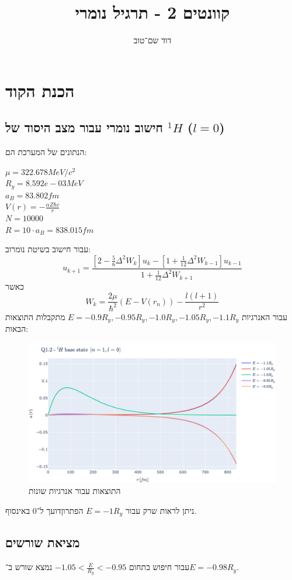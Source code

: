 \documentclass{article}
\title{קוונטים 2 - תרגיל נומרי}
\author{דוד שם־טוב}
\begin{document}
\maketitle

\section{הכנת הקוד}
\subsection{חישוב נומרי עבור מצב היסוד של ${}^{1}\!H$ ($l=0$)}
הנתונים של המערכת הם:
\begin{multicols}{3}
    $\mu = 322.678 MeV / c^2$ \\
    $R_y = 8.592e-03 MeV$ \\
    $a_B = 83.802 fm$ \\
    $V(r) = -\frac{\alpha Z \hbar c}{r}$ \\
    $N = 10000$ \\
    $R = 10\cdot a_B = 838.015 fm$
\end{multicols}
עבור חישוב בשיטת נומרוב:
$$u_{k+1} = \frac{\left[2-\frac{5}{6}\Delta^2W_k\right]u_k-\left[1+\frac{1}{12}\Delta^2W_{k-1}\right]u_{k-1}}{1+\frac{1}{12}\Delta^2W_{k+1}}$$
כאשר 
$$W_k = \frac{2\mu}{\hbar^2}\left(E-V\left(r_n\right)\right) - \frac{l(l+1)}{r^2}$$
עבור האנרגיות $ E = -0.9 R_y, -0.95 R_y, -1.0 R_y, -1.05 R_y, -1.1 R_y$ מתקבלות התוצאות הבאות:

\begin{figure}[h]\label{fig:1.2}
    \centering
    \includegraphics[width=\linewidth]{plots/1.2.pdf}
    \caption{התוצאות עבור אנרגיות שונות} %
\end{figure}
ניתן לראות שרק עבור $E = -1 R_y$ הפתרוןדועך ל־0 באינסוף.

\subsection{מציאת שורשים}
עבור חיפוש בתחום $-1.05 < \frac{E}{R_y} < -0.95$ נמצא שורש ב־$E = -0.98 R_y$.
\end{document}

